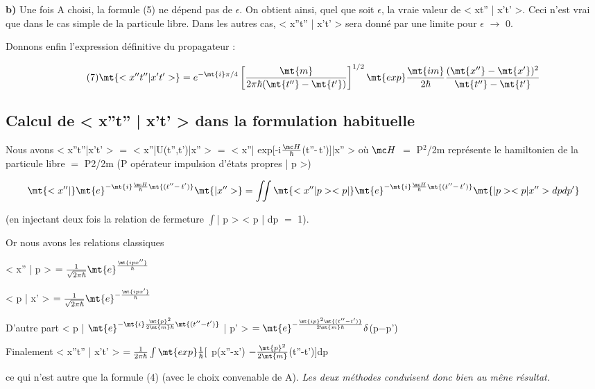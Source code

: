 {\bf b)} Une fois A choisi, la formule (5) ne dépend pas de $\epsilon$. On obtient ainsi,
quel que soit $\epsilon$, la vraie valeur de < xt'' | x't' >. Ceci n'est vrai que
dans le cas simple de la particule libre. Dans les autres cas,
< x''t'' | x't' > sera donné par une limite pour $\epsilon$ $\to$ 0.

Donnons enfin l'expression définitive du propagateur :

\[
\tag{7} \mt{<x''t''|x't'>} =  e^{-\mt{i}\pi/4}
\left[\frac{\mt{m}}{2\pi\hbar(\mt{t''}-\mt{t'})}\right]^{1/2}
\mt{exp}\frac{\mt{im}}{2\hbar}\frac{(\mt{x''}-\mt{x'})^2}{\mt{t''}-\mt{t'}}
\]
\subsection{Calcul de < x''t'' | x't' > dans la formulation habituelle} %

 

Nous avons < x''t''|x't' > $=$ < x''|U(t'',t')|x'' > $=$
< x''| exp[-i$\frac{\mc H}{\hbar}$(t''-\,t')$]$|x'' >
où $\mc H$ $=$ P$^2$/2m représente le hamiltonien de la particule
libre  $=$ P2/2m (P opérateur impulsion d'états propres | p >)

\[
\mt{< x''| }\mt{e}^{-\mt{i}\frac{\mc H}{\hbar}\mt{(t''-\,t')}}\mt{ |x'' >} = \iint
\mt{< x''|p><p| }\mt{e}^{-\mt{i}\frac{\mc H}{\hbar}\mt{(t''-\,t')}}\mt{ |p><p|x''> dp dp'}
\]

(en injectant deux fois la relation de fermeture $\int$| p > < p | dp $=$ 1).

Or nous avons les relations classiques
\begin{center}
< x'' | p > $= \frac{1}{\sqrt{2\pi\hbar}}\mt{e}^{\frac{\mt{ipx''}}{\hbar}}$
\end{center}
\begin{center}
< p | x' > $= \frac{1}{\sqrt{2\pi\hbar}}\mt{e}^{-\frac{\mt{ipx'}}{\hbar}}$
\end{center}

%
\begin{center}
D'autre part < p | $\mt{e}^{-\mt{i}\frac{\mt{p}^2}{2\mt{m}\hbar}\mt{(t''-t')}}$
| p' > $= \mt{e}^{-\frac{\mt{ip}^2\mt{(t''-t')}}{2\mt{m}\hbar}} \delta$(p$-$p')
\end{center}
\begin{center}
Finalement < x''t'' | x't' >
$=\frac{1}{2\pi\hbar}
\int\mt{exp}\frac{1}{\hbar}[$
p(x''-x')
$-\frac{\mt{p}^2}{2\mt{m}}$(t''-t')$]$dp
\end{center}

ce qui n'est autre que la formule (4) (avec le choix convenable de A).
{\it Les deux méthodes conduisent donc bien au mêne résultat.}

